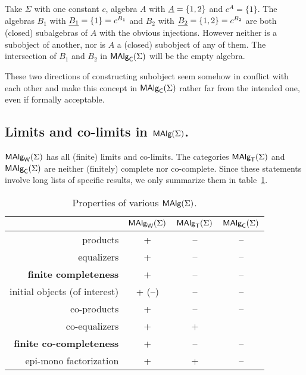 \documentclass[10pt]{article}
\begin{document}


\begin{Example}
\label{ex:nointersect}
Take $\Sigma$ with one constant $c$, algebra $A$ with $\underline {A}=\{1,2\}$ and $c^A=\{1\}$.  The algebras $B_1$ with
$\underline {B_1}=\{1\}=c^{B_{1}}$ and $B_2$ with
$\underline {B_2}=\{1,2\}=c^{B_{2}}$ are both (closed) subalgebras of $A$
with the obvious injections. However neither is a subobject of
another, nor is $A$ a (closed) subobject of any of them. %
The
intersection of $B_1$ and $B_2$ in $\mbox{\rm\sf MAlg}_{\sf C}(\Sigma)$ will be the empty algebra.
\end{Example}

\noindent
These two directions of constructing subobject seem somehow in conflict 
with each other and make
this concept in $\mbox{\rm\sf MAlg}_{\sf C}(\Sigma)$ rather far from the intended
one, even if formally acceptable.

\subsection{Limits and co-limits in $\mbox{\rm\sf MAlg}(\Sigma)$.}
\label{sub:limit}

$\mbox{\rm\sf MAlg}_{\sf W}(\Sigma)$ has all (finite) limits and co-limits. The 
categories $\mbox{\rm\sf MAlg}_{\sf T}(\Sigma)$ and $\mbox{\rm\sf MAlg}_{\sf C}(\Sigma)$ are neither (finitely) complete
nor co-complete.  Since these statements involve long lists of specific results, 
we only summarize them in table~\ref{tab:A}.

\begin{table}[htb]
\begin{center}
\begin{tabular}{|r|c|c|c|}
\hline 
                   & $\mbox{\rm\sf MAlg}_{\sf W}(\Sigma)$ & $\mbox{\rm\sf MAlg}_{\sf T}(\Sigma)$ & $\mbox{\rm\sf MAlg}_{\sf C}(\Sigma)$ \\ \hline
products           & +  & -- & -- \\
equalizers         & +  & -- & -- \\
{\bf finite completeness} & +  & -- & --  \\ \hline
initial objects (of interest) & + (--) & -- & -- \\
co-products        & +  & --  &  -- \\
co-equalizers      & +  & +  &  \\
{\bf finite co-completeness} & +  & -- & -- \\ \hline
epi-mono factorization & +  & +  & -- \\ \hline %
\end{tabular}
\end{center}
\caption{Properties of various $\mbox{\rm\sf MAlg}(\Sigma)$.}\label{tab:A} %
\end{table}
\end{document}
